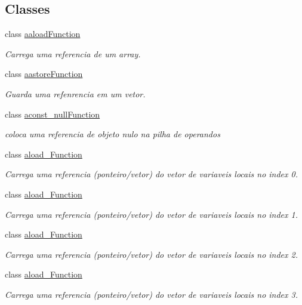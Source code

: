 \subsection*{Classes}
\begin{DoxyCompactItemize}
\item 
class \hyperlink{classInstruction_1_1aaloadFunction}{aaload\+Function}
\begin{DoxyCompactList}\small\item\em Carrega uma referencia de um array. \end{DoxyCompactList}\item 
class \hyperlink{classInstruction_1_1aastoreFunction}{aastore\+Function}
\begin{DoxyCompactList}\small\item\em Guarda uma refenrencia em um vetor. \end{DoxyCompactList}\item 
class \hyperlink{classInstruction_1_1aconst__nullFunction}{aconst\+\_\+null\+Function}
\begin{DoxyCompactList}\small\item\em coloca uma referencia de objeto nulo na pilha de operandos \end{DoxyCompactList}\item 
class \hyperlink{classInstruction_1_1aload__0Function}{aload\+\_\+Function}
\begin{DoxyCompactList}\small\item\em Carrega uma referencia (ponteiro/vetor) do vetor de variaveis locais no index 0. \end{DoxyCompactList}\item 
class \hyperlink{classInstruction_1_1aload__1Function}{aload\+\_\+Function}
\begin{DoxyCompactList}\small\item\em Carrega uma referencia (ponteiro/vetor) do vetor de variaveis locais no index 1. \end{DoxyCompactList}\item 
class \hyperlink{classInstruction_1_1aload__2Function}{aload\+\_\+Function}
\begin{DoxyCompactList}\small\item\em Carrega uma referencia (ponteiro/vetor) do vetor de variaveis locais no index 2. \end{DoxyCompactList}\item 
class \hyperlink{classInstruction_1_1aload__3Function}{aload\+\_\+Function}
\begin{DoxyCompactList}\small\item\em Carrega uma referencia (ponteiro/vetor) do vetor de variaveis locais no index 3. \end{DoxyCompactList}\item 

\end{DoxyCompactItemize}
